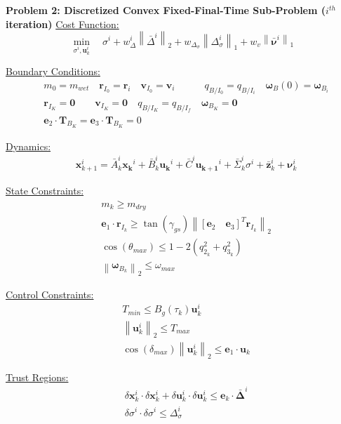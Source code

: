 \begin{mdframed}
\textbf{Problem 2: Discretized Convex Fixed-Final-Time Sub-Problem ($i^{th}$ iteration)}
\underline{Cost Function:}
\begin{equation*}
\min_{\sigma^i, \mathbf{u}_k^i} \quad \sigma^i + w_\Delta^i \left\lVert \bar{\Delta}^i \right\lVert_2 + w_{\Delta_\sigma}\left\lVert\Delta_\sigma^i\right\lVert_1 + w_v \left\lVert\bar{\bm{\nu}}^i\right\lVert_1
\end{equation*}

\underline{Boundary Conditions:}  
\begin{align*}
& m_0 = m_{wet} \quad \mathbf{r}_{I_0} = \mathbf{r}_i \quad \mathbf{v}_{I_0} = \mathbf{v}_i \quad \quad \quad{q}_{B/I_0} = {q}_{B/I _{i}} \quad \bm{\omega}_B(0) = \bm{\omega}_{B _{i}} \\
& \mathbf{r}_{I_K} = \mathbf{0} \quad \quad \mathbf{v}_{I_K} = \mathbf{0} \quad {q}_{B/I _K} = {q}_{B/I _ {f}} \quad \bm{\omega}_{B_K} = \mathbf{0} \\
& \mathbf{e}_2 \cdot \mathbf{T}_{B_K}= \mathbf{e}_3 \cdot \mathbf{T}_{B_K}= 0
\end{align*}

\underline{Dynamics:}  
\begin{align*}
& \mathbf{x}_{k+1}^i = \bar{A}_k^i\mathbf{x_k}^i + \bar{B}_k^i\mathbf{u_k}^i + \bar{C}^i\mathbf{u_{k+1}}^i + \bar{\Sigma}_k^i\sigma^i + \bar{\mathbf{z}}^i_k + \bm{\nu}_k^i
\end{align*}

\underline{State Constraints:}  
\begin{align*}
& m_k \geq m_{dry} \\
& \mathbf{e}_1 \cdot \mathbf{r}_{I_k} \geq \tan(\gamma_{gs}) \left\lVert \left[\mathbf{e}_2 \quad \mathbf{e}_3\right]^T \mathbf{r}_{I_k} \right\lVert_2 \\
& \cos(\theta_{max}) \leq 1-2(q_{2_k}^{2}+q_{3_k}^{2}) \\
& \left \lVert \bm{\omega}_{B_k} \right \lVert_2 \leq \omega_{max}
\end{align*}

\underline{Control Constraints:}  
\begin{align*}
& T_{min} \leq B_g(\tau_k)\mathbf{u}_k^i \\
& \left \lVert \mathbf{u}_k^i \right \lVert_2 \leq T_{max} \\
& \cos(\delta_{max}) \left \lVert \mathbf{u}_k^i \right \lVert_2 \leq \bm{e}_1 \cdot \mathbf{u}_k
\end{align*}

\underline{Trust Regions:}  
\begin{align*}
& \delta \mathbf{x}_k^i \cdot \delta \mathbf{x}_k^i + \delta \mathbf{u}_k^i \cdot \delta \mathbf{u}_k^i \leq \mathbf{e}_k \cdot \bm{\bar{\Delta}}^i \\
& \delta \sigma^i \cdot \delta \sigma^i \leq \Delta_\sigma^i
\end{align*}

\end{mdframed}



